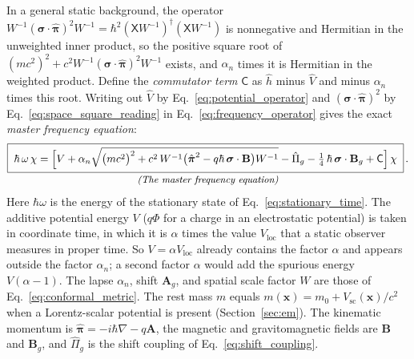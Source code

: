 \documentclass[aps,prd,onecolumn,tightenlines,nofootinbib,notitlepage,11pt,floatfix]{revtex4-2}
\theoremstyle{indentedtheorem}
\begin{document}
In a general static background, the operator $W^{-1}(\boldsymbol{\sigma}\cdot\hat{\boldsymbol{\pi}})^2 W^{-1} = \hbar^2(\mathsf{X}W^{-1})^\dagger(\mathsf{X}W^{-1})$ is nonnegative and Hermitian in the unweighted inner product, so the positive square root of $(mc^2)^2+c^2W^{-1}(\boldsymbol{\sigma}\cdot\hat{\boldsymbol{\pi}})^2W^{-1}$ exists, and $\alpha_n$ times it is Hermitian in the weighted product. Define the \emph{commutator term} $\mathsf{C}$ as $\hat{h}$ minus $\hat{V}$ and minus $\alpha_n$ times this root. Writing out $\hat{V}$ by Eq.~\eqref{eq:potential_operator} and $(\boldsymbol{\sigma}\cdot\hat{\boldsymbol{\pi}})^2$ by Eq.~\eqref{eq:space_square_reading} in Eq.~\eqref{eq:frequency_operator} gives the exact \emph{master frequency equation}:
\begin{equation}
    \begin{gathered}
    \boxed{\;
    \hbar\,\omega \, \chi = \Big[V + \alpha_n\sqrt{\big(mc^2\big)^2 + c^2 \, W^{-1}\big(\hat{\boldsymbol{\pi}}^2 - q\hbar\,\boldsymbol{\sigma}\cdot\mathbf{B}\big)W^{-1}} - \hat{\Pi}_g - \tfrac{1}{4}\,\hbar\,\boldsymbol{\sigma}\cdot\mathbf{B}_g + \mathsf{C}\Big] \, \chi\;} \, . \\[-3pt]
    \text{\small\itshape (The master frequency equation)}
    \end{gathered}
    \label{eq:master}
\end{equation}
Here $\hbar\omega$ is the energy of the stationary state of Eq.~\eqref{eq:stationary_time}. The additive potential energy $V$ ($q\Phi$ for a charge in an electrostatic potential) is taken in coordinate time, in which it is $\alpha$ times the value $V_\text{loc}$ that a static observer measures in proper time. So $V=\alpha V_\text{loc}$ already contains the factor $\alpha$ and appears outside the factor $\alpha_n$; a second factor $\alpha$ would add the spurious energy $V(\alpha-1)$. The lapse $\alpha_n$, shift $\mathbf{A}_g$, and spatial scale factor $W$ are those of Eq.~\eqref{eq:conformal_metric}. The rest mass $m$ equals $m(\mathbf{x}) = m_0 + V_\text{sc}(\mathbf{x})/c^2$ when a Lorentz-scalar potential is present (Section~\ref{sec:em}). The kinematic momentum is $\hat{\boldsymbol{\pi}}=-i\hbar\nabla-q\mathbf{A}$, the magnetic and gravitomagnetic fields are $\mathbf{B}$ and $\mathbf{B}_g$, and $\hat{\Pi}_g$ is the shift coupling of Eq.~\eqref{eq:shift_coupling}.
\end{document}
